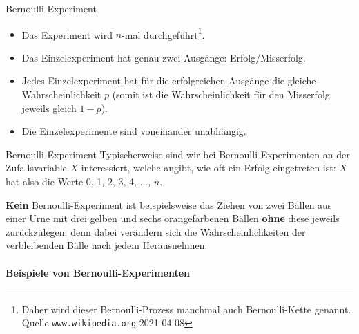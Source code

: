 \begin{definition}{Bernoulli-Experiment}{}
\begin{itemize}
\item Das Experiment wird $n$-mal durchgeführt\footnote{Daher wird dieser
Bernoulli-Prozess manchmal auch Bernoulli-Kette genannt. Quelle
\texttt{www.wikipedia.org} 2021-04-08}.
\item Das Einzelexperiment hat genau zwei Ausgänge: Erfolg/Misserfolg.
\item Jedes Einzelexperiment hat für die erfolgreichen Ausgänge die gleiche
      Wahrscheinlichkeit $p$ (somit ist die Wahrscheinlichkeit für den
      Misserfolg jeweils gleich $1-p$).
\item Die Einzelexperimente sind voneinander unabhängig.
\end{itemize}
\end{definition}

\begin{bemerkung}{Bernoulli-Experiment}{}
Typischerweise sind wir bei Bernoulli-Experimenten an der
Zufallsvariable $X$ interessiert, welche angibt, wie oft ein Erfolg
eingetreten ist: $X$ hat also die Werte 0, 1, 2, 3, 4, ..., $n$.
\end{bemerkung}

\textbf{Kein} Bernoulli-Experiment ist beispielsweise das Ziehen von zwei Bällen aus
einer Urne mit drei gelben und sechs orangefarbenen Bällen \textbf{ohne} diese
jeweils zurückzulegen; denn dabei verändern sich die
Wahrscheinlichkeiten der verbleibenden Bälle nach jedem Herausnehmen.
\newpage


\paragraph{Beispiele von Bernoulli-Experimenten}

